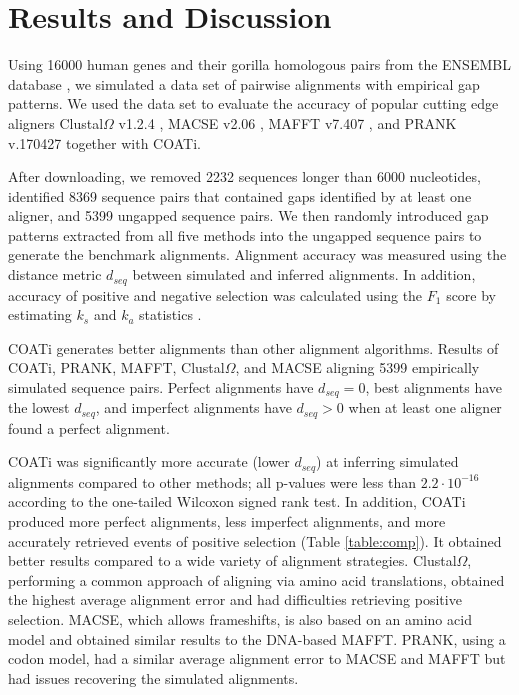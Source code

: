 \section*{Results and Discussion}
Using 16000 human genes and their gorilla homologous pairs from the ENSEMBL
database , we simulated a data set of pairwise
alignments with empirical gap patterns.
We used the data set to evaluate the accuracy of popular cutting edge aligners
Clustal$\Omega$ v1.2.4 ,
MACSE v2.06 , MAFFT v7.407
, and PRANK v.170427 
together with COATi.

After downloading, we removed 2232 sequences longer than 6000 nucleotides, identified 8369 sequence pairs that contained gaps identified by at least one aligner, and 5399 ungapped sequence pairs.
We then randomly introduced gap patterns extracted from all five methods into the ungapped sequence pairs to generate the benchmark alignments.
Alignment accuracy was measured using the distance metric $d_{seq}$
 between simulated and inferred
alignments.
In addition, accuracy of positive and negative selection was calculated
using the $F_1$ score by estimating $k_s$ and $k_a$ statistics
.

\begin{table}[!ht]
\centering

 \caption{COATi generates better alignments than other alignment algorithms. Results of COATi, PRANK, MAFFT, Clustal$\Omega$, and MACSE aligning 5399 empirically simulated sequence pairs. Perfect alignments have $d_{seq}=0$, best alignments have the lowest $d_{seq}$, and imperfect alignments have $d_{seq}>0$ when at least one aligner found a perfect alignment.}
 \label{table:comp}
\end{table}

COATi was significantly more accurate (lower $d_{seq}$) at inferring simulated alignments compared to other methods; all p-values were less than $2.2 \cdot 10^{-16}$ according to the one-tailed Wilcoxon signed rank test.
In addition, COATi produced more perfect alignments, less imperfect alignments, and more accurately retrieved events of positive selection (Table \ref{table:comp}).
It obtained better results compared to a wide variety of alignment strategies.
Clustal$\Omega$, performing a common approach of aligning via amino acid translations, obtained the highest average alignment error and had difficulties retrieving positive selection.
MACSE, which allows frameshifts, is also based on an amino acid model and obtained similar results to the DNA-based MAFFT.
PRANK, using a codon model, had a similar average alignment error to MACSE and MAFFT but had issues recovering the simulated alignments.

